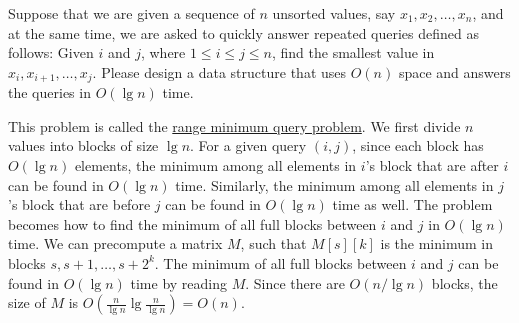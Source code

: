 \begin{Exercise}
Suppose that we are given a sequence of $n$ unsorted values, say $x_1, x_2, \dots, x_n$, and at the same time, we are asked to quickly answer repeated queries defined as follows: Given $i$ and $j$, where $1 \leq i \leq j \leq n$, find the smallest value in $x_i, x_{i+1}, \dots, x_j$. Please design a data structure that uses $O(n)$ space and answers the queries in $O(\lg n)$ time. 
\end{Exercise}
\begin{Answer}
This problem is called the \href{https://en.wikipedia.org/wiki/Range_minimum_query}{range minimum query problem}. 
We first divide $n$ values into blocks of size $\lg n$.
For a given query $(i, j)$, since each block has $O(\lg n)$ elements, the minimum among all elements in $i$'s block that are after $i$ can be found in $O(\lg n)$ time.
Similarly, the minimum among all elements in $j$'s block that are before $j$ can be found in $O(\lg n)$ time as well.
The problem becomes how to find the minimum of all full blocks between $i$ and $j$ in $O(\lg n)$ time.
We can precompute a matrix $M$, such that $M[s][k]$ is the minimum in blocks $s, s + 1, \dots, s + 2^k$.
The minimum of all full blocks between $i$ and $j$ can be found in $O(\lg n)$ time by reading $M$.
Since there are $O(n / \lg n)$ blocks, the size of $M$ is $O(\frac{n}{\lg n} \lg \frac{n}{\lg n}) = O(n)$.
\end{Answer}


\printbibliography[heading=subbibliography]
